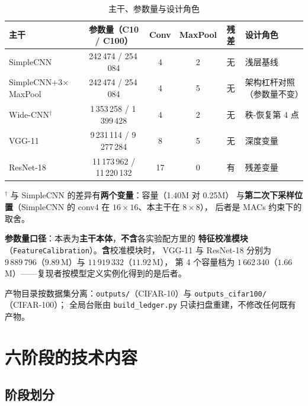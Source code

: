 \documentclass[11pt,a4paper]{ctexart}
\begin{document}
\begin{table}[t]
\centering
\caption{主干、参数量与设计角色}
\label{tab:arch}
\small
\begin{tabular}{lccccl}
\toprule
主干 & 参数量（C10 / C100） & Conv & MaxPool & 残差 & 设计角色 \\
\midrule
SimpleCNN & 242\,474 / 254\,084 & 4 & 2 & 无 & 浅层基线 \\
SimpleCNN+3$\times$MaxPool & 242\,474 / 254\,084 & 4 & 5 & 无 & 架构杠杆对照（参数量不变） \\
Wide-CNN$^\dagger$ & 1\,353\,258 / 1\,399\,428 & 4 & 2 & 无 & 秩-恢复第 4 点 \\
VGG-11 & 9\,231\,114 / 9\,277\,284 & 8 & 5 & 无 & 深度变量 \\
ResNet-18 & 11\,173\,962 / 11\,220\,132 & 17 & 0 & 有 & 残差变量 \\
\bottomrule
\end{tabular}

\vspace{2pt}
\begin{minipage}{0.94\textwidth}
\footnotesize
$^\dagger$ 与 SimpleCNN 的差异有\textbf{两个变量}：容量（1.40M 对 0.25M）
与\textbf{第二次下采样位置}（SimpleCNN 的 conv4 在 $16\times16$、本主干在 $8\times8$），
后者是 MACs 约束下的取舍。\par
\textbf{参数量口径}：本表为\textbf{主干本体}，\textbf{不含}各实验配方里的
\textbf{特征校准模块}（\texttt{FeatureCalibration}）。\textbf{含}校准模块时，
VGG-11 与 ResNet-18 分别为 $9\,889\,796$（$9.89$\,M）与 $11\,919\,332$（$11.92$\,M），
第 4 个容量档为 $1\,662\,340$（$1.66$\,M）——复现者按模型定义实例化得到的是后者。
\end{minipage}
\end{table}

产物目录按数据集分离：\texttt{outputs/}（CIFAR-10）与 \texttt{outputs\_cifar100/}（CIFAR-100）；
全局台账由 \texttt{build\_ledger.py} 只读扫盘重建，不修改任何既有产物。

\section{六阶段的技术内容}
\label{sec:findings}

\subsection{阶段划分}
\end{document}
